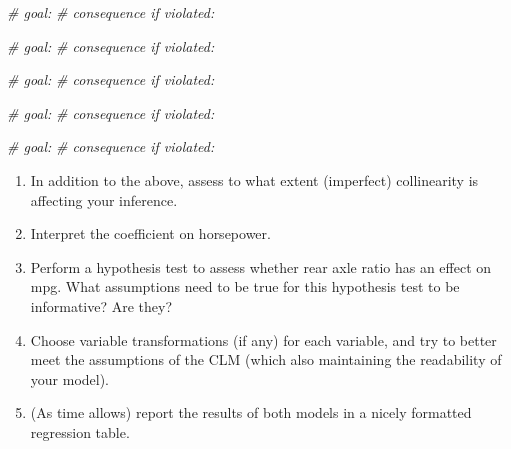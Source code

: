 \documentclass[
]{book}
\newenvironment{Shaded}{\begin{snugshade}}{\end{snugshade}}
\newcommand{\CommentTok}[1]{\textcolor[rgb]{0.56,0.35,0.01}{\textit{#1}}}
\theoremstyle{definition}
\theoremstyle{definition}
\theoremstyle{definition}
\theoremstyle{definition}
\theoremstyle{remark}
\begin{document}
\begin{Shaded}
\begin{Highlighting}[]
\CommentTok{\# goal:}
\CommentTok{\# consequence if violated:}
\end{Highlighting}
\end{Shaded}

\begin{Shaded}
\begin{Highlighting}[]
\CommentTok{\# goal:}
\CommentTok{\# consequence if violated:}
\end{Highlighting}
\end{Shaded}

\begin{Shaded}
\begin{Highlighting}[]
\CommentTok{\# goal:}
\CommentTok{\# consequence if violated:}
\end{Highlighting}
\end{Shaded}

\begin{Shaded}
\begin{Highlighting}[]
\CommentTok{\# goal:}
\CommentTok{\# consequence if violated:}
\end{Highlighting}
\end{Shaded}

\begin{Shaded}
\begin{Highlighting}[]
\CommentTok{\# goal:}
\CommentTok{\# consequence if violated:}
\end{Highlighting}
\end{Shaded}

\begin{enumerate}
\def\labelenumi{\arabic{enumi}.}
\setcounter{enumi}{2}
\item
  In addition to the above, assess to what extent (imperfect) collinearity is affecting your inference.
\item
  Interpret the coefficient on horsepower.
\item
  Perform a hypothesis test to assess whether rear axle ratio has an effect on mpg. What assumptions need to be true for this hypothesis test to be informative? Are they?
\item
  Choose variable transformations (if any) for each variable, and try to better meet the assumptions of the CLM (which also maintaining the readability of your model).
\item
  (As time allows) report the results of both models in a nicely formatted regression table.
\end{enumerate}
\end{document}
